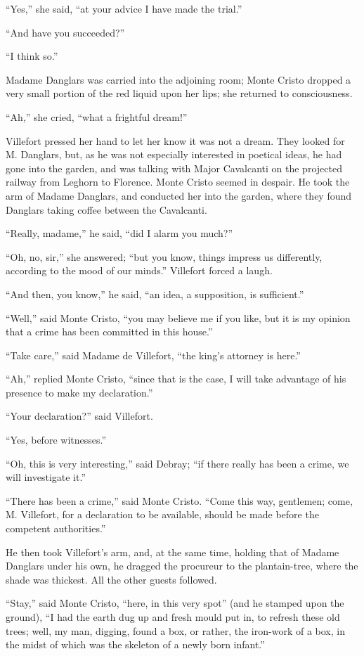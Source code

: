 “Yes,” she said, “at your advice I have made the trial.”

“And have you succeeded?”

“I think so.”

Madame Danglars was carried into the adjoining room; Monte Cristo
dropped a very small portion of the red liquid upon her lips; she
returned to consciousness.

“Ah,” she cried, “what a frightful dream!”

Villefort pressed her hand to let her know it was not a dream. They
looked for M. Danglars, but, as he was not especially interested in
poetical ideas, he had gone into the garden, and was talking with Major
Cavalcanti on the projected railway from Leghorn to Florence. Monte
Cristo seemed in despair. He took the arm of Madame Danglars, and
conducted her into the garden, where they found Danglars taking coffee
between the Cavalcanti.

“Really, madame,” he said, “did I alarm you much?”

“Oh, no, sir,” she answered; “but you know, things impress us
differently, according to the mood of our minds.” Villefort forced a
laugh.

“And then, you know,” he said, “an idea, a supposition, is sufficient.”

“Well,” said Monte Cristo, “you may believe me if you like, but it is
my opinion that a crime has been committed in this house.”

“Take care,” said Madame de Villefort, “the king’s attorney is here.”

“Ah,” replied Monte Cristo, “since that is the case, I will take
advantage of his presence to make my declaration.”

“Your declaration?” said Villefort.

“Yes, before witnesses.”

“Oh, this is very interesting,” said Debray; “if there really has been
a crime, we will investigate it.”

“There has been a crime,” said Monte Cristo. “Come this way, gentlemen;
come, M. Villefort, for a declaration to be available, should be made
before the competent authorities.”

He then took Villefort’s arm, and, at the same time, holding that of
Madame Danglars under his own, he dragged the procureur to the
plantain-tree, where the shade was thickest. All the other guests
followed.

“Stay,” said Monte Cristo, “here, in this very spot” (and he stamped
upon the ground), “I had the earth dug up and fresh mould put in, to
refresh these old trees; well, my man, digging, found a box, or rather,
the iron-work of a box, in the midst of which was the skeleton of a
newly born infant.”

